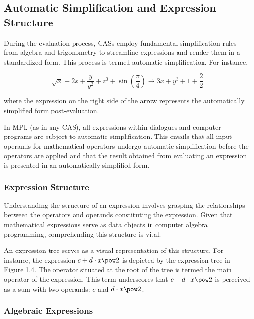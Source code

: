 \subsection{Automatic Simplification and Expression Structure}

During the evaluation process, \acp{CAS} employ fundamental simplification rules from algebra and trigonometry to streamline expressions and render them in a standardized form. This process is termed automatic simplification. For instance,

\begin{equation*}
\sqrt{x}+2x+\dfrac{y}{y^2}+z^0+\sin\left(\dfrac{\pi}{4}\right) \rightarrow 3x+y^3+1+\dfrac{2}{2}
\end{equation*}

where the expression on the right side of the arrow represents the automatically simplified form post-evaluation.

In \ac{MPL} (as in any \ac{CAS}), all expressions within dialogues and computer programs are subject to automatic simplification. This entails that all input operands for mathematical operators undergo automatic simplification before the operators are applied and that the result obtained from evaluating an expression is presented in an automatically simplified form.

\subsubsection{Expression Structure}

Understanding the structure of an expression involves grasping the relationships between the operators and operands constituting the expression. Given that mathematical expressions serve as data objects in computer algebra programming, comprehending this structure is vital.

An expression tree serves as a visual representation of this structure. For instance, the expression $c+d \cdot x \pow 2$ is depicted by the expression tree in Figure 1.4. The operator situated at the root of the tree is termed the main operator of the expression. This term underscores that $c+d \cdot x \pow 2$ is perceived as a sum with two operands: $c$ and $d \cdot x \pow 2$.

\subsubsection{Algebraic Expressions}

